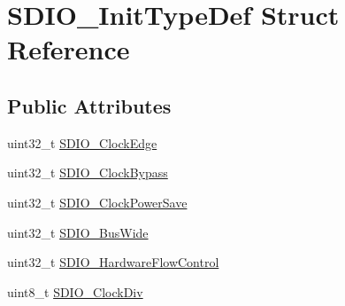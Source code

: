 \hypertarget{structSDIO__InitTypeDef}{
\section{SDIO\_\-InitTypeDef Struct Reference}
\label{structSDIO__InitTypeDef}
}
\subsection*{Public Attributes}
\begin{DoxyCompactItemize}
\item 
uint32\_\-t \hyperlink{structSDIO__InitTypeDef_a3252c846b68988b8ae70ca0d40030a52}{SDIO\_\-ClockEdge}
\item 
uint32\_\-t \hyperlink{structSDIO__InitTypeDef_a6a06a65a5630b21da261f46125cb20b1}{SDIO\_\-ClockBypass}
\item 
uint32\_\-t \hyperlink{structSDIO__InitTypeDef_ac236cc5a376a65b9de64a31dab816364}{SDIO\_\-ClockPowerSave}
\item 
uint32\_\-t \hyperlink{structSDIO__InitTypeDef_a0540529f615c2b29933b442bc326f0a7}{SDIO\_\-BusWide}
\item 
uint32\_\-t \hyperlink{structSDIO__InitTypeDef_a5f57f8aca913de9aed47ef708c05f34f}{SDIO\_\-HardwareFlowControl}
\item 
uint8\_\-t \hyperlink{structSDIO__InitTypeDef_a4166ee534e6cf8ac2c6a6a03bec45b06}{SDIO\_\-ClockDiv}
\end{DoxyCompactItemize}


